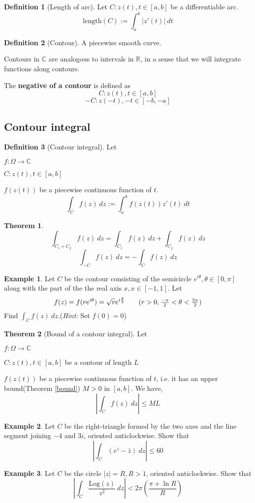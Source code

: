 \documentclass[10pt, a4paper]{extarticle}
\theoremstyle{definition}
\newtheorem{thm}{Theorem}
\newtheorem{defn}{Definition}
\newtheorem{eg}{Example}
\begin{document}
\begin{defn}[Length of arc]
	Let $C:z(t),t\in[a,b]$ be a differentiable arc.
	\[\text{length}(C):=\int_a^b|z'(t)|\ dt\]
\end{defn}

\begin{defn}[Contour]
	A piecewise smooth curve.

	Contours in $\mathbb{C}$ are analogous to intervals in $\mathbb{R}$, in a sense that we will integrate functions along contours.

	The \textbf{negative of a contour} is defined as
	\[C:z(t),t\in[a,b]\]
	\[-C:z(-t),-t\in[-b,-a]\]
\end{defn}

\subsection{Contour integral}
\begin{defn}[Contour integral]
	Let

	$f:\Omega\to\mathbb{C}$

	$C:z(t),t\in[a,b]$

	$f(z(t))$ be a piecewise continuous function of $t$.
	\[\int_Cf(z)\ dz:=\int_a^bf(z(t))z'(t)\ dt\]
\end{defn}
\begin{thm}
	\[\int_{C_1+C_2}f(z)\ dz=\int_{C_1}f(z)\ dz+\int_{C_2}f(z)\ dz\]
	\[\int_{-C}f(z)\ dz=-\int_C f(z)\ dz\]
\end{thm}
\begin{eg}
	Let $C$ be the contour consisting of the semicircle $e^{i\theta},\theta\in[0,\pi]$ along with the part of the the real axis $x, x\in[-1,1]$. Let
	\[f(z)=f(re^{i\theta})=\sqrt{r}e^{i\frac{\theta}{2}}\tag*{($r>0, \frac{-\pi}{2}<\theta<\frac{3\pi}{2}$)}\]
	Find $\int_C f(z)\ dz$.(\textit{Hint:} Set $f(0)=0$)
\end{eg}

\begin{thm}[Bound of a contour integral]
	Let

	$f:\Omega\to\mathbb{C}$

	$C:z(t),t\in[a,b]$ be a contour of length $L$

	$f(z(t))$ be a piecewise continuous function of $t$, i.e. it has an upper bound(Theorem \ref{bound}) $M>0$ in $[a,b]$.
	We have,
	\[\left|\int_Cf(z)\ dz\right|\leq ML\]
\end{thm}
\begin{eg}
	Let $C$ be the right-triangle formed by the two axes and the line segment joining $-4$ and $3i$, oriented anticlockwise. Show that \[\left|\int_C (e^z-\bar{z})\ dz\right|\leq 60\]
\end{eg}
\begin{eg}
	Let $C$ be the circle $|z|=R,R>1$, oriented anticlockwise. Show that
	\[\left|\int_C \frac{\text{Log}(z)}{z^2}\ dz\right|<2\pi\left(\frac{\pi+\ln R}{R}\right)\]
\end{eg}
\end{document}
